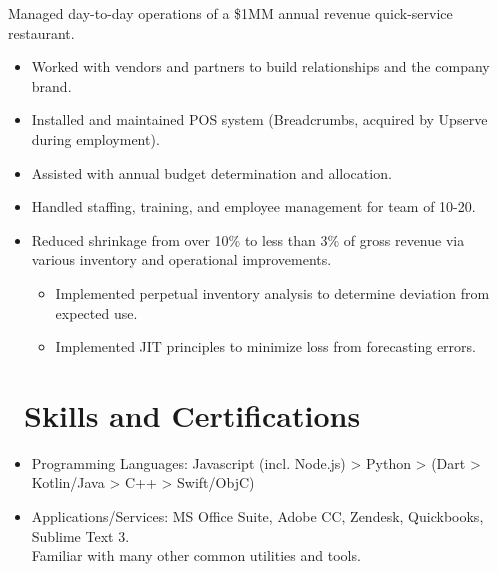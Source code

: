\documentclass{resume}
\begin{document}

Managed day-to-day operations of a \$1MM annual revenue quick-service restaurant.
\begin{itemize}
  \item Worked with vendors and partners to build relationships and the company brand.
  \item Installed and maintained POS system (Breadcrumbs, acquired by Upserve during employment).
  \item Assisted with annual budget determination and allocation.
  \item Handled staffing, training, and employee management for team of 10-20.
  \item Reduced shrinkage from over 10\% to less than 3\% of gross revenue via various inventory and operational improvements.
  \begin{itemize}
    \item Implemented perpetual inventory analysis to determine deviation from expected use.
    \item Implemented JIT principles to minimize loss from forecasting errors.
  \end{itemize}
\end{itemize}



\section{\faCogs\ Skills and Certifications}
\begin{itemize}[parsep=0.5ex]
  \item Programming Languages: Javascript (incl. Node.js) > Python > (Dart > Kotlin/Java > C++ > Swift/ObjC)
  \item Applications/Services: MS Office Suite, Adobe CC, Zendesk, Quickbooks, Sublime Text 3.\\ Familiar with many other common utilities and tools.
\end{itemize}
\end{document}
